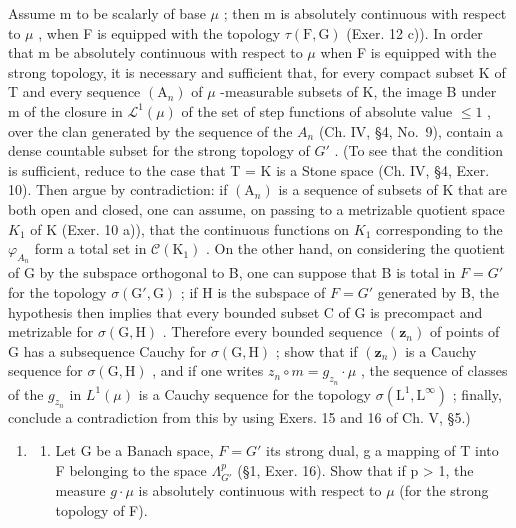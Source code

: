 Assume m to be scalarly of base \(\mu\) ; then m is absolutely continuous with respect to \(\mu\) , when F is equipped with the topology \(\tau(\mathrm{F},\mathrm{G})\) (Exer. 12 c)). In order that m be absolutely continuous with respect to \(\mu\) when F is equipped with the strong topology, it is necessary and sufficient that, for every compact subset K of T and every sequence \((\mathrm{A}_{n})\) of \(\mu\) -measurable subsets of K, the image B under m of the closure in \(\mathcal{L}^{1}(\mu)\) of the set of step functions of absolute value \(\leqslant1\) , over the clan generated by the sequence of the \(A_{n}\) (Ch. IV, §4, No.~9), contain a dense countable subset for the strong topology of \(G'\) . (To see that the condition is sufficient, reduce to the case that T = K is a Stone space (Ch. IV, §4, Exer. 10). Then argue by contradiction: if \((\mathrm{A}_{n})\) is a sequence of subsets of K that are both open and closed, one can assume, on passing to a metrizable quotient space \(K_{1}\) of K (Exer. 10 a)), that the continuous functions on \(K_{1}\) corresponding to the \(\varphi_{A_{n}}\) form a total set in \(\mathcal{C}(\mathrm{K}_{1})\) . On the other hand, on considering the quotient of G by the subspace orthogonal to B, one can suppose that B is total in \(F = G'\) for the topology \(\sigma(\mathrm{G}',\mathrm{G})\) ; if H is the subspace of \(F = G'\) generated by B, the hypothesis then implies that every bounded subset C of G is precompact and metrizable for \(\sigma(\mathrm{G},\mathrm{H})\) . Therefore every bounded sequence \((\mathbf{z}_{n})\) of points of G has a subsequence Cauchy for \(\sigma(\mathrm{G},\mathrm{H})\) ; show that if \((\mathbf{z}_{n})\) is a Cauchy sequence for \(\sigma(\mathrm{G},\mathrm{H})\) , and if one writes \(z_{n} \circ m = g_{z_{n}} \cdot \mu\) , the sequence of classes of the \(g_{z_{n}}\) in \(L^{1}(\mu)\) is a Cauchy sequence for the topology \(\sigma(\mathrm{L}^{1},\mathrm{L}^{\infty})\) ; finally, conclude a contradiction from this by using Exers. 15 and 16 of Ch. V, §5.)

\begin{enumerate}
\def\labelenumi{\arabic{enumi})}
\setcounter{enumi}{13}
\tightlist
\item
  \begin{enumerate}
  \def\labelenumii{\alph{enumii})}
  \tightlist
  \item
    Let G be a Banach space, \(F = G'\) its strong dual, g a mapping of T into F belonging to the space \(\Lambda_{G'}^{p}\) (§1, Exer. 16). Show that if p \textgreater{} 1, the measure \(g \cdot \mu\) is absolutely continuous with respect to \(\mu\) (for the strong topology of F).
  \end{enumerate}
\end{enumerate}

